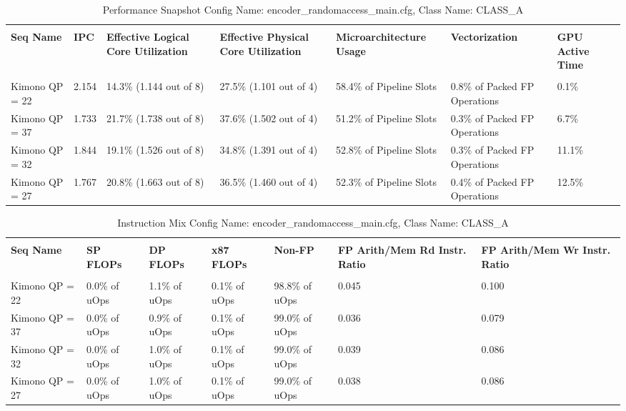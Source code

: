 \documentclass{article}%
\begin{document}
\begin{longtabu}{| X[l] | X[l] | X[l] | X[l] | X[l] | X[l] | X[l] |}%
\caption{%
Performance Snapshot\newline%
 Config Name: encoder\_randomaccess\_main.cfg,\newline%
 Class Name: CLASS\_A\newline%
%
}%
\hline%
&&&&&&\\%
\textbf{Seq Name}&\textbf{IPC}&\textbf{Effective Logical Core Utilization}&\textbf{Effective Physical Core Utilization}&\textbf{Microarchitecture Usage}&\textbf{Vectorization}&\textbf{GPU Active Time}\\%
&&&&&&\\%
\hline%
\endhead%
Kimono\newline%
 QP = 22&2.154&14.3\% (1.144 out of 8)&27.5\% (1.101 out of 4)&58.4\% of Pipeline Slots&0.8\% of Packed FP Operations&0.1\%\\%
\hline%
Kimono\newline%
 QP = 37&1.733&21.7\% (1.738 out of 8)&37.6\% (1.502 out of 4)&51.2\% of Pipeline Slots&0.3\% of Packed FP Operations&6.7\%\\%
\hline%
Kimono\newline%
 QP = 32&1.844&19.1\% (1.526 out of 8)&34.8\% (1.391 out of 4)&52.8\% of Pipeline Slots&0.3\% of Packed FP Operations&11.1\%\\%
\hline%
Kimono\newline%
 QP = 27&1.767&20.8\% (1.663 out of 8)&36.5\% (1.460 out of 4)&52.3\% of Pipeline Slots&0.4\% of Packed FP Operations&12.5\%\\%
\hline%
\end{longtabu}%
\begin{longtabu}{| X[l] | X[l] | X[l] | X[l] | X[l] | X[l] | X[l] |}%
\caption{%
Instruction Mix\newline%
 Config Name: encoder\_randomaccess\_main.cfg,\newline%
 Class Name: CLASS\_A\newline%
%
}%
\hline%
&&&&&&\\%
\textbf{Seq Name}&\textbf{SP FLOPs}&\textbf{DP FLOPs}&\textbf{x87 FLOPs}&\textbf{Non{-}FP}&\textbf{FP Arith/Mem Rd Instr. Ratio}&\textbf{FP Arith/Mem Wr Instr. Ratio}\\%
&&&&&&\\%
\hline%
\endhead%
Kimono\newline%
 QP = 22&0.0\% of uOps&1.1\% of uOps&0.1\% of uOps&98.8\% of uOps&0.045&0.100\\%
\hline%
Kimono\newline%
 QP = 37&0.0\% of uOps&0.9\% of uOps&0.1\% of uOps&99.0\% of uOps&0.036&0.079\\%
\hline%
Kimono\newline%
 QP = 32&0.0\% of uOps&1.0\% of uOps&0.1\% of uOps&99.0\% of uOps&0.039&0.086\\%
\hline%
Kimono\newline%
 QP = 27&0.0\% of uOps&1.0\% of uOps&0.1\% of uOps&99.0\% of uOps&0.038&0.086\\%
\hline%
\end{longtabu}%
\end{document}
